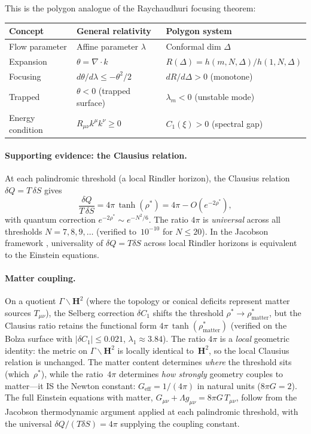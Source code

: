 \noindent
This is the polygon analogue of the Raychaudhuri focusing theorem:
\begin{center}
\small
\begin{tabular}{lll}
\toprule
Concept & General relativity & Polygon system \\
\midrule
Flow parameter & Affine parameter $\lambda$ & Conformal dim $\Delta$ \\
Expansion & $\theta = \nabla \cdot k$ &
  $R(\Delta) = h(m,N,\Delta)/h(1,N,\Delta)$ \\
Focusing & $d\theta/d\lambda \le -\theta^2/2$ &
  $dR/d\Delta > 0$ (monotone) \\
Trapped & $\theta < 0$ (trapped surface) &
  $\lambda_m < 0$ (unstable mode) \\
Energy condition & $R_{\mu\nu}k^\mu k^\nu \ge 0$ &
  $C_1(\xi) > 0$ (spectral gap) \\
\bottomrule
\end{tabular}
\end{center}

\paragraph{Supporting evidence: the Clausius relation.}
At each palindromic threshold (a local Rindler horizon),
the Clausius relation $\delta Q = T\,\delta S$ gives
\begin{equation}\label{eq:clausius}
  \frac{\delta Q}{T\,\delta S}
  = 4\pi\,\tanh(\rho^*)
  = 4\pi - O(e^{-2\rho^*}),
\end{equation}
with quantum correction $e^{-2\rho^*} \sim e^{-N^2/6}$.
The ratio $4\pi$ is \emph{universal} across all thresholds
$N = 7, 8, 9, \ldots$ (verified to~$10^{-10}$ for $N \le 20$).
In the Jacobson framework \citep{Jacobson1995},
universality of $\delta Q = T\delta S$ across local Rindler horizons
is equivalent to the Einstein equations.

\paragraph{Matter coupling.}
On a quotient $\Gamma\backslash\mathbf{H}^2$ (where the topology
or conical deficits represent matter sources $T_{\mu\nu}$),
the Selberg correction $\delta C_1$ shifts the threshold
$\rho^* \to \rho^*_{\mathrm{matter}}$, but the Clausius ratio
retains the functional form $4\pi\,\tanh(\rho^*_{\mathrm{matter}})$
(verified on the Bolza surface with $|\delta C_1| \le 0.021$,
$\lambda_1 \approx 3.84$).
The ratio $4\pi$ is a \emph{local} geometric identity: the metric
on $\Gamma\backslash\mathbf{H}^2$ is locally identical to~$\mathbf{H}^2$,
so the local Clausius relation is unchanged.
The matter content determines \emph{where} the threshold sits
(which~$\rho^*$), while the ratio~$4\pi$ determines \emph{how strongly}
geometry couples to matter---it IS the Newton constant:
$G_{\mathrm{eff}} = 1/(4\pi)$ in natural units ($8\pi G = 2$).
The full Einstein equations with matter,
$G_{\mu\nu} + \Lambda g_{\mu\nu} = 8\pi G\,T_{\mu\nu}$,
follow from the Jacobson thermodynamic argument applied at
each palindromic threshold, with the universal
$\delta Q/(T\delta S) = 4\pi$ supplying the coupling constant.

